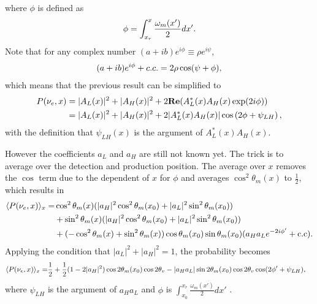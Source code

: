 \documentclass[letterpaper,12pt,english]{sphinxmanual}
\begin{document}
where \(\phi\) is defined as
\begin{gather}
\begin{split}\phi = \int_{x_r}^{x} \frac{\omega_m(x')}{2}dx'.\end{split}\notag
\end{gather}
Note that for any complex number \((a+ib)e^{i\phi} \equiv \rho e^{i\psi}\),
\begin{gather}
\begin{split}(a+ib)e^{i\phi} + c.c.=2 \rho \cos(\psi+\phi),\end{split}\notag
\end{gather}
which means that the previous result can be simplified to
\begin{gather}
\begin{split}P(\nu_e,x) &=  \lvert A_L(x) \rvert^2 + \lvert A_H(x) \rvert^2 + 2 \mathbf{Re}( A_L^*(x) A_H(x) \exp(2i\phi) ) \\
& =  \lvert A_L(x) \rvert^2 + \lvert A_H(x) \rvert^2 + 2 \lvert A_L^*(x) A_H(x) \rvert \cos\left( 2\phi + \psi_{LH} \right),\end{split}\notag
\end{gather}
with the definition that \(\psi_{LH}(x)\) is the argument of \(A_L^*(x)A_H(x)\).

However the coefficients \(a_L\) and \(a_H\) are still not known yet. The trick is to average over the detection and production position. The average over \(x\) removes the \(\cos\) term due to the dependent of \(x\) for \(\phi\) and averages \(\cos^2\theta_m(x)\) to \(\frac{1}{2}\), which results in
\begin{gather}
\begin{split}\langle P(\nu_e,x)\rangle_{x} =& \cos^2\theta_m(x) (\lvert a_H\rvert^2 \cos^2\theta_m(x_0) + \lvert a_L\rvert^2 \sin^2\theta_m(x_0) ) \\
& + \sin^2\theta_m(x) ( \lvert a_H\rvert^2 \cos^2\theta_m(x_0) + \lvert a_L \rvert^2 \sin^2\theta_m(x_0) ) \\
& + ( - \cos^2\theta_m(x) + \sin^2\theta_m(x) ) \cos\theta_m(x_0)\sin\theta_m(x_0) ( a_H a_L e^{-2i\phi'} + \mathrm{c.c}) .\end{split}\notag
\end{gather}
Applying the condition that \(\lvert a_L \rvert^2 + \lvert a_H \rvert^2 = 1\), the probability becomes
\begin{gather}
\begin{split}\langle P(\nu_e,x)\rangle_{x} =& \frac{1}{2} + \frac{1}{2} (1 - 2 \lvert a_H \rvert^2) \cos 2\theta_m(x_0) \cos 2\theta_v - \lvert a_H a_L \rvert \sin 2\theta_m(x_0)\cos 2\theta_v \cos ( 2 \phi' + \psi_{LH} ),\end{split}\notag
\end{gather}
where \(\psi_{LH}\) is the argument of \(a_H a_L\) and \(\phi\) is \(\int_{x_0}^{x_r} \frac{\omega_m(x')}{2}dx'\) .
\end{document}
